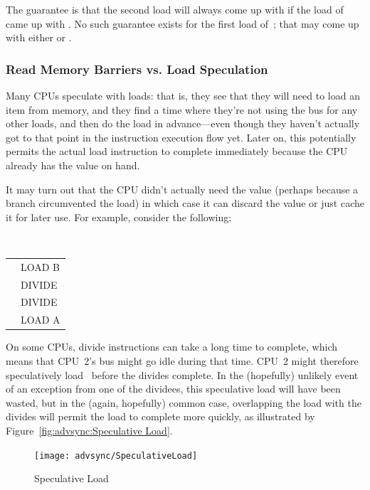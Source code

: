 The guarantee is that the second load will always come up with 
if the
load of~ came up with .
No such guarantee exists for the first load
of~; that may come up with either  or .

\subsubsection{Read Memory Barriers vs. Load Speculation}
\label{sec:advsync:Read Memory Barriers vs. Load Speculation}

Many CPUs speculate with loads: that is, they see that they will need to
load an item from memory, and they find a time where they're not using
the bus for any other loads, and then do the load in advance---even though
they haven't actually got to that point in the instruction execution
flow yet.
Later on, this potentially permits the actual load instruction to
complete immediately because the CPU already has the value on hand.

It may turn out that the CPU didn't actually need the value (perhaps because a
branch circumvented the load) in which case it can discard the value or just
cache it for later use.
For example, consider the following:

\vspace{5pt}
\begin{minipage}[t]{\columnwidth}
\tt
\scriptsize
\begin{tabular}{l|p{1.5in}}
	\nf{CPU 1} &	\nf{CPU 2} \\
	\hline
		&	LOAD B \\
		&	DIVIDE \\
		&	DIVIDE \\
		&	LOAD A \\
\end{tabular}
\end{minipage}
\vspace{5pt}

On some CPUs, divide instructions can take a long time to complete,
which means that CPU~2's bus might go idle during that time.
CPU~2 might therefore speculatively load~ before the divides
complete.
In the (hopefully) unlikely event of an exception from one of the dividees,
this speculative load will have been wasted, but in the (again, hopefully)
common case, overlapping the load with the divides will permit the load
to complete more quickly, as illustrated by
Figure~\ref{fig:advsync:Speculative Load}.

\begin{figure}[htbp]
\centering
\texttt{[image: advsync/SpeculativeLoad]}
\caption{Speculative Load}
\end{figure}

